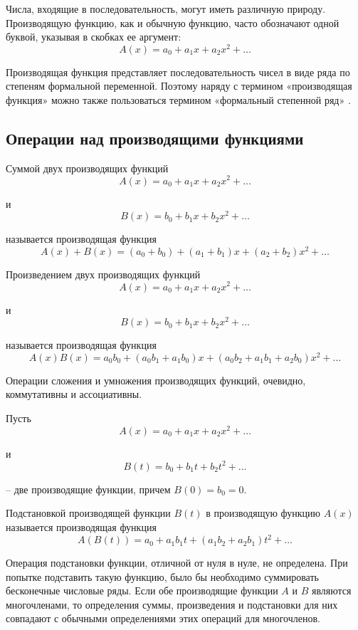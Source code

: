 \documentclass[
russian,
cp1251,
14pt,
simple
]{eskdtext}
\theoremstyle{definition}
\begin{document}
Числа, входящие в последовательность, могут иметь различную природу. Производящую функцию, как и обычную функцию, часто обозначают одной буквой, указывая в скобках ее аргумент:
$$
A\left(x\right) = a_0 + a_1x + a_2x^2 + \ldots
$$

Производящая функция представляет последовательность чисел в виде ряда по степеням формальной переменной. Поэтому наряду с термином «производящая функция» можно также пользоваться термином «формальный степенной ряд» \cite{Lando}.

\subsection{Операции над производящими функциями}

Суммой двух производящих функций 
$$
A\left(x\right) = a_0 + a_1 x + a_2 x^2 + \ldots
$$

и
$$
B\left(x\right) = b_0 + b_1 x + b_2 x^2 + \ldots
$$

называется производящая функция
$$
A\left(x\right) + B\left(x\right) = \left(a_0 + b_0\right) + \left(a_1 + b_1\right) x + \left(a_2 + b_2\right) x^2 + \ldots
$$

Произведением двух производящих функций
$$
A\left(x\right) = a_0 + a_1 x + a_2 x^2 + \ldots
$$

и
$$
B\left(x\right) = b_0 + b_1 x + b_2 x^2 + \ldots
$$

называется производящая функция
$$
A\left(x\right) B\left(x\right) = a_0 b_0 + \left(a_0 b_1 + a_1 b_0\right) x + \left(a_0 b_2 + a_1 b_1 + a_2 b_0\right) x^2 + \ldots
$$

Операции сложения и умножения производящих функций, очевидно, коммутативны и ассоциативны.

Пусть
$$
A\left(x\right) = a_0 + a_1 x + a_2 x^2 + \ldots
$$

и
$$
B\left(t\right) = b_0 + b_1 t + b_2 t^2 + \ldots
$$

– две производящие функции, причем $B\left(0\right) = b_0 = 0$.

Подстановкой производящей функции $B\left(t\right)$ в производящую функцию $A\left(x\right)$ называется производящая функция
$$
A\left(B\left(t\right)\right) = a_0 + a_1 b_1 t + \left(a_1 b_2 + a_2 b_1\right) t^2 + \ldots
$$

Операция подстановки функции, отличной от нуля в нуле, не определена. При попытке подставить такую функцию, было бы необходимо суммировать бесконечные числовые ряды. Если обе производящие функции $A$ и $B$ являются многочленами, то определения суммы, произведения и подстановки для них совпадают с обычными определениями этих операций для многочленов.
\end{document}
